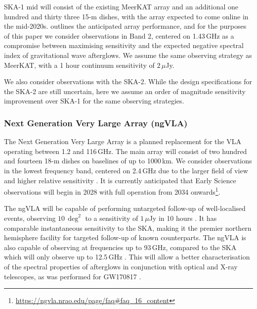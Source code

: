 SKA-1 mid will consist of the existing MeerKAT array and an additional one hundred and thirty three 15-m dishes, with the array expected to come online in the mid-2020s. \citet{2019arXiv191212699B} outlines the anticipated array performance, and for the purposes of this paper we consider observations in Band 2, centered on 1.43\,GHz as a compromise between maximising sensitivity and the expected negative spectral index of gravitational wave afterglows. We assume the same observing strategy as MeerKAT, with a 1 hour continuum sensitivity of $2\,\mu$Jy.

We also consider observations with the SKA-2. While the design specifications for the SKA-2 are still uncertain, here we assume an order of magnitude sensitivity improvement over SKA-1 for the same observing strategies.


\subsubsection{Next Generation Very Large Array (ngVLA)}
The Next Generation Very Large Array \citep[ngVLA;][]{2018ASPC..517....3M} is a planned replacement for the VLA operating between 1.2 and 116\,GHz. The main array will consist of two hundred and fourteen 18-m dishes on baselines of up to 1000\,km. We consider observations in the lowest frequency band, centered on 2.4\,GHz due to the larger field of view and higher relative sensitivity \citep{2018ASPC..517...15S}. It is currently anticipated that Early Science observations will begin in 2028 with full operation from 2034 onwards\footnote{\url{https://ngvla.nrao.edu/page/faq\#faq_16_content}}.

The ngVLA will be capable of performing untargeted follow-up of well-localised events, observing $10\,\deg^2$ to a sensitivity of $1\,\mu$Jy in 10 hours \citep{2019arXiv190310589C}. It has comparable instantaneous sensitivity to the SKA, making it the premier northern hemisphere facility for targeted follow-up of known counterparts. The ngVLA is also capable of observing at frequencies up to 93\,GHz, compared to the SKA which will only observe up to 12.5\,GHz \citep{2019arXiv191212699B}. This will allow a better characterisation of the spectral properties of afterglows in conjunction with optical and X-ray telescopes, as was performed for GW170817 \citep{2020arXiv200602382M,2020arXiv200601150T}.

